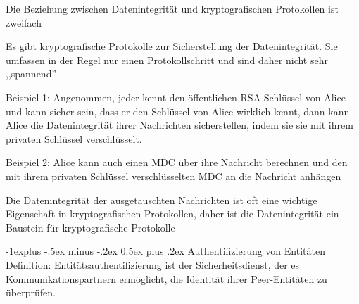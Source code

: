 \documentclass[a4paper]{article}
\makeatletter
\renewcommand{\subsection}{\@startsection{subsection}{2}{0mm}%
 {-1explus -.5ex minus -.2ex}%
 {0.5ex plus .2ex}%
 {\normalfont\normalsize\bfseries}}
\makeatother
\begin{document}
\begin{multicols}{3}
      \begin{itemize*}
            \item Die Beziehung zwischen Datenintegrität und kryptografischen Protokollen ist zweifach
            \item Es gibt kryptografische Protokolle zur Sicherstellung der Datenintegrität. Sie umfassen in der Regel nur einen Protokollschritt und sind daher nicht sehr ,,spannend''
            \item Beispiel 1: Angenommen, jeder kennt den öffentlichen RSA-Schlüssel von Alice und kann sicher sein, dass er den Schlüssel von Alice wirklich kennt, dann kann Alice die Datenintegrität ihrer Nachrichten sicherstellen, indem sie sie mit ihrem privaten Schlüssel verschlüsselt.
            \item Beispiel 2: Alice kann auch einen MDC über ihre Nachricht berechnen und den mit ihrem privaten Schlüssel verschlüsselten MDC an die Nachricht anhängen
            \item Die Datenintegrität der ausgetauschten Nachrichten ist oft eine wichtige Eigenschaft in kryptografischen Protokollen, daher ist die Datenintegrität ein Baustein für kryptografische Protokolle
      \end{itemize*}

      \subsection{Authentifizierung von Entitäten}
      Definition: Entitätsauthentifizierung ist der Sicherheitsdienst, der es Kommunikationspartnern ermöglicht, die Identität ihrer Peer-Entitäten zu überprüfen.


\end{multicols}
\end{document}
